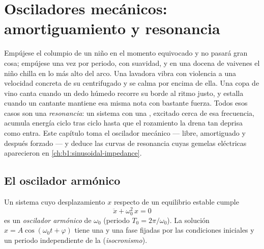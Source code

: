 \chapter{Osciladores mecánicos: amortiguamiento y resonancia}\label{ch:b1:oscillators-resonance}

Empújese el columpio de un niño en el momento equivocado y no pasará gran
cosa; empújese una vez por periodo, con suavidad, y en una docena de
vaivenes el niño chilla en lo más alto del arco. Una lavadora vibra con
violencia a una velocidad concreta de su centrifugado y se calma por
encima de ella. Una copa de vino canta cuando un dedo húmedo recorre su
borde al ritmo justo, y estalla cuando un cantante mantiene esa misma nota
con bastante fuerza. Todos esos casos son una \emph{resonancia}: un
sistema con una , excitado cerca de esa frecuencia,
acumula energía ciclo tras ciclo hasta que el rozamiento la drena tan
deprisa como entra. Este capítulo toma el oscilador mecánico --- libre,
amortiguado y después forzado --- y deduce las curvas de resonancia cuyas
gemelas eléctricas aparecieron en \cref{ch:b1:sinusoidal-impedance}.

\section{El oscilador armónico}

\begin{definition}\label{def:b1:oscillators-resonance:harmonic}
Un sistema cuyo desplazamiento $x$ respecto de un equilibrio estable cumple
\[
\ddot x + \omega_0^2\,x = 0
\]
es un \emph{oscilador armónico} de \emph{}
$\omega_0$ (periodo $T_0 = 2\pi/\omega_0$). La solución $x = A\cos(\omega_0t
+ \varphi)$ tiene una  y una fase fijadas por las condiciones
iniciales y un periodo independiente de la  (\emph{isocronismo}).
\end{definition}

